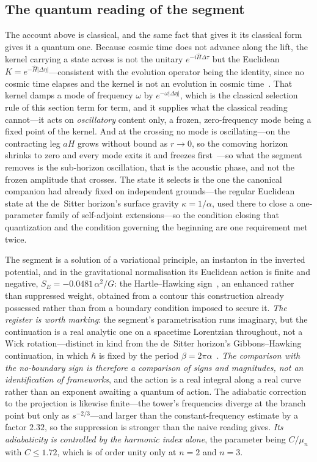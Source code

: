 \documentclass[11pt,a4paper]{article}
\theoremstyle{plain}
\theoremstyle{definition}
\theoremstyle{remark}
\begin{document}
\subsection{The quantum reading of the segment}\label{sec:lift-quantum}

The account above is classical, and the same fact that gives it its classical form gives it a quantum one.
Because cosmic time does not advance along the lift, the kernel carrying a state across is not the unitary
$e^{-i\hat{H}\Delta\tau}$ but the Euclidean $K=e^{-\hat{H}\lvert\Delta\eta\rvert}$---consistent with the
evolution operator being the identity, since no cosmic time elapses and the kernel is not an evolution in
cosmic time~\cite{JanzenCanonicalTime}. That kernel damps a mode of frequency $\omega$ by
$e^{-\omega\lvert\Delta\eta\rvert}$, which is the classical selection rule of this section term for term, and
it supplies what the classical reading cannot---it acts on \emph{oscillatory} content only, a frozen,
zero-frequency mode being a fixed point of the kernel. And at the crossing no mode is oscillating---on the contracting leg $aH$ grows without bound as $r\to0$, so the comoving horizon shrinks to zero and every mode exits it and freezes first~\cite{JanzenCRcosmology}---so what the segment removes is the sub-horizon oscillation, that is the acoustic phase, and not the frozen amplitude that crosses. The state it
selects is the one the canonical companion had already fixed on independent grounds---the regular Euclidean
state at the de~Sitter horizon's surface gravity $\kappa=1/\alpha$, used there to close a one-parameter family
of self-adjoint extensions---so the condition closing that quantization and the condition governing the
beginning are one requirement met twice.

The segment is a solution of a variational principle, an instanton in the inverted potential, and in the
gravitational normalisation its Euclidean action is finite and negative,
$S_{E}=-0.0481\,\alpha^{2}/G$: the Hartle--Hawking sign~\cite{HartleHawking1983}, an enhanced rather than suppressed weight, obtained
from a contour this construction already possessed rather than from a boundary condition imposed to secure it. \emph{The register is worth marking}: the segment's parametrisation runs imaginary, but the continuation is a real analytic one on a spacetime Lorentzian throughout, not a Wick rotation---distinct in kind from the de~Sitter horizon's Gibbons--Hawking continuation, in which $\hbar$ is fixed by the period $\beta=2\pi\alpha$~\cite{JanzenGeometricCore}. \emph{The comparison with the no-boundary sign is therefore a comparison of signs and magnitudes, not an identification of frameworks}, and the action is a real integral along a real curve rather than an exponent awaiting a quantum of action.
The adiabatic correction to the projection is likewise finite---the tower's frequencies diverge at the branch
point but only as $s^{-2/3}$---and larger than the constant-frequency estimate by a factor $2.32$, so the
suppression is stronger than the naive reading gives. \emph{Its adiabaticity is controlled by the harmonic index
alone}, the parameter being $C/\mu_{n}$ with $C\le1.72$, which is of order unity only at $n=2$ and $n=3$.
\end{document}

